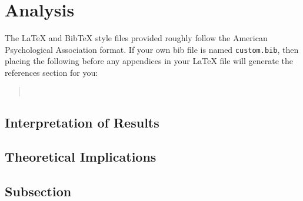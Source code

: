 \section{Analysis}

\nocite{Ando2005,augenstein-etal-2016-stance,andrew2007scalable,rasooli-tetrault-2015,goodman-etal-2016-noise,harper-2014-learning}

The \LaTeX{} and Bib\TeX{} style files provided roughly follow the American Psychological Association format.
If your own bib file is named \texttt{custom.bib}, then placing the following before any appendices in your \LaTeX{} file will generate the references section for you:
\begin{quote}
\begin{verbatim}


\end{verbatim}
\end{quote}
% 
% 

\subsection{Interpretation of Results}
\lipsum[53-56]

\subsection{Theoretical Implications}
\lipsum[57-59]

\subsection{Subsection}
\lipsum[60-62]